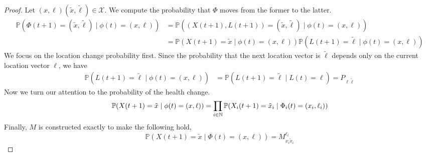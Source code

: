 \documentclass[a4paper]{article}
\begin{document}
	\begin{proof}
		Let $(x, \ell) (\tilde{x}, \tilde{\ell}) \in \mathcal{X}$. We compute the probability that $\Phi$ moves from the former to the latter.
		\begin{align*}
			\mathbb{P}(\Phi(t + 1) = (\tilde{x}, \tilde{\ell}) \mid \phi(t) = (x, \ell)) &= \mathbb{P}((X(t + 1), L(t + 1)) = (\tilde{x}, \tilde{\ell}) \mid \phi(t) = (x, \ell))\\
			&= \mathbb{P}(X(t + 1) = \tilde{x} \mid \phi(t) = (x, \ell))\mathbb{P}(L(t + 1) =  \tilde{\ell} \mid \phi(t) = (x, \ell))
		\end{align*}
		We focus on the location change probability first. Since the probability that the next location vector is $\tilde{\ell}$ depends only on the current location vector $\ell$, we have 
		\begin{align*}
			\mathbb{P}(L(t + 1) = \tilde{\ell} \mid \phi(t) = (x, \ell)) &= \mathbb{P}(L(t + 1) = \tilde{\ell} \mid L(t) = \ell) = P_{\ell \tilde{\ell}}
		\end{align*}
		Now we turn our attention to the probability of the health change. 
		$$\mathbb{P}(X(t + 1) = \tilde{x} \mid \phi(t) = (x, \ell)) = \prod_{i \in \mathbb{N}}\mathbb{P}(X_{i}(t + 1) = \tilde{x}_{i} \mid \Phi_{i}(t) = (x_{i}, \ell_{i}))$$
		Finally, $M$ is constructed exactly to make the following hold,
		$$\mathbb{P}(X(t+1) = \tilde{x} \mid \Phi(t) = (x, \ell)) = M^{\ell_{i}}_{x_{i}\tilde{x}_{i}}$$
	\end{proof}
\end{document}
